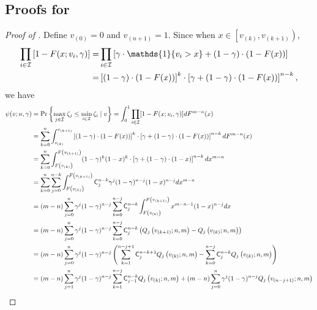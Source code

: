 \subsection{Proofs for }

\begin{proof}[Proof of ] Define $v_{(0)} = 0$ and $v_{(n+1)} = 1$. Since when $x \in \left[v_{(k)}, v_{(k+1)}\right)$, 
\begin{align*}
 \prod_{i\in \I}\left[1-F(x;v_i,\gamma)\right]=&\prod_{i\in \I}\left[\gamma\cdot \mathds{1}\{v_i> x\} + (1-\gamma)\cdot (1-F(x))\right]\\
 =& \left[(1-\gamma)\cdot (1-F(x))\right]^k
 \cdot 
 \left[\gamma + (1-\gamma)\cdot (1 -F(x))\right]^{n-k},   
\end{align*}
we have 
\begin{align*}
\psi(v;n,\gamma)&=  \Pr\left\{
\max_{j\in \barI} \zeta_j \leq \min_{i\in \I}\zeta_i
\mid v\right\} =
\int_0^1\prod_{i\in \I}[1-F(x;v_i,\gamma)] dF^{m-n}(x)\\
 &= \sum_{k=0}^n \int_{v_{(k)}}^{v_{(k+1)}}
 \left[(1-\gamma)\cdot (1-F(x))\right]^k
 \cdot 
 \left[\gamma + (1-\gamma)\cdot (1 -F(x))\right]^{n-k}dF^{m-n}(x)\\
 & = \sum_{k=0}^n \int_{F\left(v_{(k)}\right)}^{F\left(v_{(k+1)}\right)}
 (1-\gamma)^k (1-x)^k
 \cdot 
 \left[\gamma + (1-\gamma)\cdot (1 -x)\right]^{n-k}dx^{m-n}\\
 & = \sum_{k=0}^n \sum_{j=0}^{n-k}\int_{F\left(v_{(k)}\right)}^{F\left(v_{(k+1)}\right)}\C^{n-k}_j\gamma^j
 (1-\gamma)^{n-j} (1-x)^{n-j}
 dx^{m-n}\\
 & = (m-n)\sum_{j=0}^n \gamma^j
 (1-\gamma)^{n-j} \sum_{k=0}^{n-j}\C^{n-k}_j\int_{F\left(v_{(k)}\right)}^{F\left(v_{(k+1)}\right)} x^{m-n-1}(1-x)^{n-j}
 dx\\
 & = (m-n)\sum_{j=0}^n \gamma^j
 (1-\gamma)^{n-j} \sum_{k=0}^{n-j}\C^{n-k}_j\left(Q_j\left(v_{(k+1)};n,m\right) - Q_j\left(v_{(k)};n,m\right)\right)\\
 & = (m-n)\sum_{j=0}^n \gamma^j
 (1-\gamma)^{n-j}\left( \sum_{k=1}^{n-j+1}\C^{n-k+1}_jQ_j\left(v_{(k)};n,m\right) - \sum_{k=0}^{n-j}\C^{n-k}_jQ_j\left(v_{(k)};n,m\right)\right)\\
 & = (m-n)\sum_{j=1}^n \gamma^j
 (1-\gamma)^{n-j} \sum_{k=1}^{n-j}\C^{n-k}_{j-1}Q_j\left(v_{(k)};n,m\right) + (m-n)\sum_{j=0}^n \gamma^j
 (1-\gamma)^{n-j} Q_j\left(v_{(n-j+1)};n,m\right)\\

\end{align*}
\end{proof}
